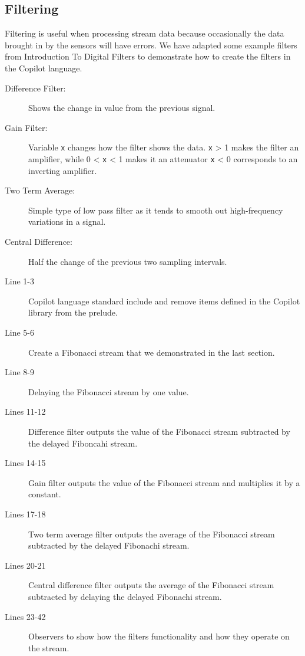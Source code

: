 \subsection{Filtering} \label{sec:filter}

Filtering is useful when processing stream data because occasionally the data
brought in by the sensors will have errors. We have adapted some example filters
from Introduction To Digital Filters \cite{Tyson2013} to demonstrate how to create the filters in the Copilot
language.
\begin{description}
 \item[Difference Filter:] Shows the change in value from the previous signal.
 \item[Gain Filter:]  Variable {\tt x} changes how the filter shows the data. {\tt x} \textgreater{} 1 makes the filter an amplifier, while 0 \textless{} {\tt x} \textless{} 1 makes it an attenuator {\tt x} \textless{} 0 corresponds to an inverting amplifier. 
 \item[Two Term Average:] Simple type of low pass filter as it tends to smooth out high-frequency variations in a signal.
 \item[Central Difference:] Half the change of the previous two sampling intervals. 
\end{description} 
%

%

\begin{description}
  \item[Line 1-3] Copilot language standard include and remove 
  items defined in the Copilot library from the prelude.
  \item[Line 5-6] Create a Fibonacci stream that we demonstrated in the last section.
  \item[Line 8-9] Delaying the Fibonacci stream by one value.
  \item[Lines 11-12] Difference filter outputs the value of the Fibonacci stream subtracted by the delayed Fiboncahi stream. 
  \item[Lines 14-15] Gain filter outputs the value of the Fibonacci stream and multiplies it by a constant.
  \item[Lines 17-18] Two term average filter outputs the average of the Fibonacci stream subtracted by the delayed Fibonachi stream. 
  \item[Lines 20-21] Central difference filter outputs the average of the Fibonacci stream subtracted by delaying the delayed Fibonachi stream. 
  \item[Lines 23-42] Observers to show how the filters functionality and how they operate on the stream. 

\end{description}

